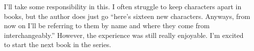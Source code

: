 \documentclass[12pt]{article}[titlepage]
\newcommand{\say}[1]{``#1''}
\newcommand{\1}{\={a}}
\newcommand{\2}{\={e}}
\newcommand{\3}{\={\i}}
\newcommand{\4}{\=o}
\newcommand{\5}{\=u}
\newcommand{\6}{\={A}}
\renewcommand{\,}{\textsuperscript{,}}
\begin{document}
I'll take some responsibility in this.
I often struggle to keep characters apart in books, but the author does just go \say{here's sixteen new characters. Anyways, from now on I'll be referring to them by name and where they come from interchangeably.}
However, the experience was still really enjoyable.
I'm excited to start the next book in the series.
\end{document}

